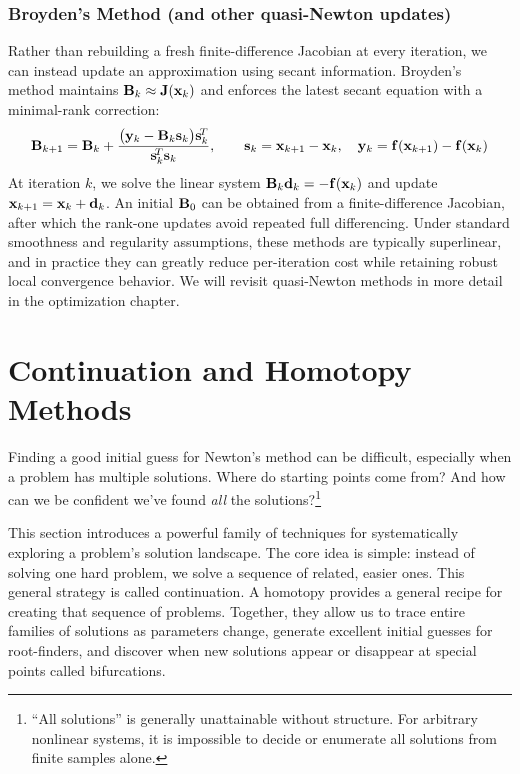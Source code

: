 \subsubsection{Broyden's Method (and other quasi-Newton updates)}
Rather than rebuilding a fresh finite-difference Jacobian at every iteration, we can instead update an approximation using secant information. Broyden's method maintains $\mathbf{B}_k \approx \mathbf{J}(\mathbf{x}_k)$ and enforces the latest secant equation with a minimal-rank correction:
\begin{equation}
  \mathbf{B}_{k+1}
  =
  \mathbf{B}_k
  +
  \frac{\bigl(\mathbf{y}_k - \mathbf{B}_k \mathbf{s}_k\bigr)\mathbf{s}_k^{\!T}}
       {\mathbf{s}_k^{\!T}\mathbf{s}_k},
  \qquad
  \mathbf{s}_k = \mathbf{x}_{k+1}-\mathbf{x}_k,
  \quad
  \mathbf{y}_k = \mathbf{f}(\mathbf{x}_{k+1})-\mathbf{f}(\mathbf{x}_k)
\end{equation}
At iteration $k$, we solve the linear system $\mathbf{B}_k \mathbf{d}_k = -\mathbf{f}(\mathbf{x}_k)$ and update $\mathbf{x}_{k+1}=\mathbf{x}_k+\mathbf{d}_k$. An initial $\mathbf{B}_0$ can be obtained from a finite-difference Jacobian, after which the rank-one updates avoid repeated full differencing. Under standard smoothness and regularity assumptions, these methods are typically superlinear, and in practice they can greatly reduce per-iteration cost while retaining robust local convergence behavior. We will revisit quasi-Newton methods in more detail in the optimization chapter.


\section{Continuation and Homotopy Methods}

Finding a good initial guess for Newton's method can be difficult, especially when a problem has multiple solutions. Where do starting points come from? And how can we be confident we've found \emph{all} the solutions?\footnote{``All solutions'' is generally unattainable without structure. For arbitrary nonlinear systems, it is impossible to decide or enumerate all solutions from finite samples alone.}  %

This section introduces a powerful family of techniques for systematically exploring a problem's solution landscape. The core idea is simple: instead of solving one hard problem, we solve a sequence of related, easier ones. This general strategy is called continuation. A homotopy provides a general recipe for creating that sequence of problems. Together, they allow us to trace entire families of solutions as parameters change, generate excellent initial guesses for root-finders, and discover when new solutions appear or disappear at special points called bifurcations.

